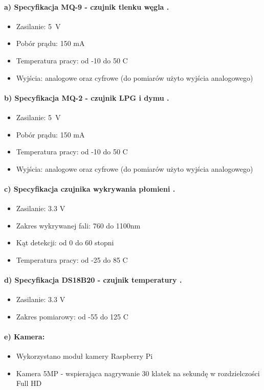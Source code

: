 \paragraph{a) Specyfikacja MQ-9 - czujnik tlenku węgla \cite{specyfikacjaMQ-9}.}
\begin{itemize} 
\item Zasilanie: 5~V
\item Pobór prądu: 150 mA
\item Temperatura pracy: od -10 do 50 \textdegree{}C
\item Wyjścia: analogowe oraz cyfrowe (do pomiarów użyto wyjścia analogowego)
\end{itemize}
\paragraph{b) Specyfikacja MQ-2 - czujnik LPG i dymu \protect\cite{specyfikacjaMQ-2}.}
\begin{itemize} 
\item Zasilanie: 5~V
\item Pobór prądu: 150 mA
\item Temperatura pracy: od -10 do 50 \textdegree{}C
\item Wyjścia: analogowe oraz cyfrowe (do pomiarów użyto wyjścia analogowego)
\end{itemize}
\paragraph{c) Specyfikacja czujnika wykrywania płomieni \protect\cite{specyfikacjaFlame}.}
\begin{itemize} 
\item Zasilanie: 3.3 V
\item Zakres wykrywanej fali: 760 do 1100nm
\item Kąt detekcji: od 0 do 60 stopni
\item Temperatura pracy: od -25 do 85 \textdegree{}C
\end{itemize}
\paragraph{d) Specyfikacja DS18B20 - czujnik temperatury \protect\cite{specyfikacjaTemp}.}
\begin{itemize} 
\item Zasilanie: 3.3 V
\item Zakres pomiarowy: od -55 do 125 \textdegree{}C
\end{itemize}
\paragraph{e) Kamera:}
\begin{itemize} 
\item Wykorzystano moduł kamery Raspberry Pi
\item Kamera 5MP - wspierająca nagrywanie 30 klatek na sekundę w rozdzielczości Full HD
\end{itemize}
